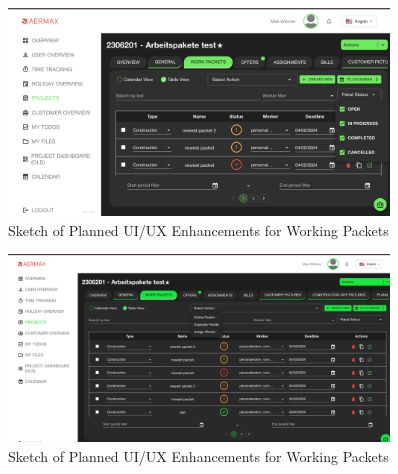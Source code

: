 \begin{figure}[H]
    \centering
    \includegraphics[width=0.9\textwidth]{src/assets/chapters/newTable1.png}
    \caption{Sketch of Planned UI/UX Enhancements for Working Packets }
    \label{fig:ui_ux_enhancements}
\end{figure}


\begin{figure}[H]
    \centering
    \includegraphics[width=0.9\textwidth]{src/assets/chapters/newTable2.png}
    \caption{Sketch of Planned UI/UX Enhancements for Working Packets }
    \label{fig:ui_ux_enhancements}
\end{figure}
